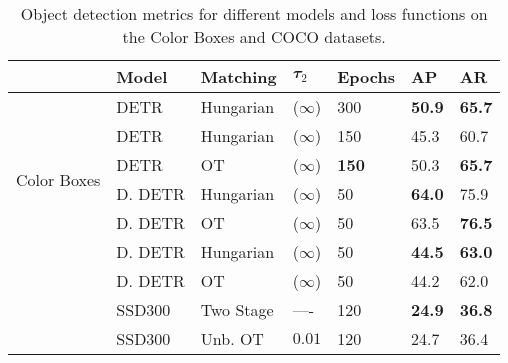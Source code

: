 \begin{table} 
    \centering \small
    \begin{tabular}{lllllll}
        \toprule
        &\textbf{Model} & \textbf{Matching} & $\mathbfit{\tau_2}$ &\textbf{Epochs} & \textbf{AP} & \textbf{AR}  \\
        \midrule
        \multirow{6}{*}{\hspace{-.4em}\begin{sideways}Color Boxes\end{sideways}} & DETR        & Hungarian  & ($\infty$)   & 300   & \textbf{50.9}  & \textbf{65.7} \\
        &DETR        &   Hungarian & ($\infty$) &150   & 45.3  & 60.7 \\
        &DETR        & OT          & ($\infty$) & \textbf{150}   & 50.3  & \textbf{65.7}  \\ 
        \cmidrule(lr){2-7}
        &D. DETR   & Hungarian    &($\infty$)& 50    & \textbf{64.0}  & 75.9 \\
        &D. DETR   & OT           &($\infty$)& 50    & 63.5  & \textbf{76.5} \\ 
        \midrule
        \multirow{4.5}{*}{\hspace{-.4em}\begin{sideways}COCO\end{sideways}}&D. DETR  &Hungarian & ($\infty$)& 50            & \textbf{44.5}  & \textbf{63.0} \\
        &D. DETR   & OT       &($\infty$)& 50            & 44.2  & 62.0 \\ 
        \cmidrule(lr){2-7}
        &SSD300         & Two Stage & ---- & 120            & \textbf{24.9}  & \textbf{36.8} \\
        &SSD300         & Unb. OT  & $0.01$ & 120            & 24.7    & 36.4 \\
        \bottomrule
    \end{tabular}
    \caption{Object detection metrics for different models and loss functions on the Color Boxes and COCO datasets.}
    \label{tab:metrics_stats}
\end{table}

